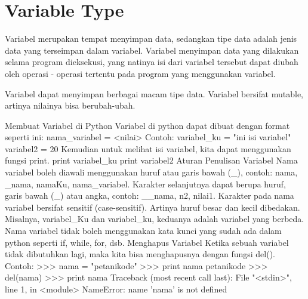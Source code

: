 \section{Variable Type}
Variabel merupakan tempat menyimpan data, sedangkan tipe data adalah jenis data yang terseimpan dalam variabel. Variabel menyimpan data yang dilakukan selama program dieksekusi, yang natinya isi dari variabel tersebut dapat diubah oleh operasi - operasi tertentu pada program yang menggunakan variabel.

Variabel dapat menyimpan berbagai macam tipe data. Variabel bersifat mutable, artinya nilainya bisa berubah-ubah.

Membuat Variabel di Python
Variabel di python dapat dibuat dengan format seperti ini:
nama_variabel = <nilai>
Contoh:
variabel_ku = "ini isi variabel"
variabel2 = 20
Kemudian untuk melihat isi variabel, kita dapat menggunakan fungsi print.
print variabel_ku
print variabel2
Aturan Penulisan Variabel
Nama variabel boleh diawali menggunakan huruf atau garis bawah (_), contoh: nama, _nama, namaKu, nama_variabel.
Karakter selanjutnya dapat berupa huruf, garis bawah (_) atau angka, contoh: __nama, n2, nilai1.
Karakter pada nama variabel bersifat sensitif (case-sensitif). Artinya huruf besar dan kecil dibedakan. Misalnya, variabel_Ku dan variabel_ku, keduanya adalah variabel yang berbeda.
Nama variabel tidak boleh menggunakan kata kunci yang sudah ada dalam python seperti if, while, for, dsb.
Menghapus Variabel
Ketika sebuah variabel tidak dibutuhkan lagi, maka kita bisa menghapusnya dengan fungsi del().
Contoh:
>>> nama = "petanikode"
>>> print nama
petanikode
>>> del(nama)
>>> print nama
Traceback (most recent call last):
  File "<stdin>", line 1, in <module>
NameError: name 'nama' is not defined
